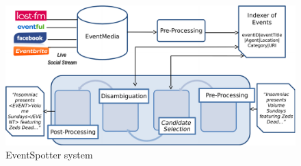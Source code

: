 \documentclass[10pt,a4paper]{article}
\begin{document}
%
%
%
%
%
%	
%
%	 

\begin{figure}
\includegraphics[width=\textwidth]{architecture}
\caption{EventSpotter system}
\label{fig:architecture}
\end{figure}
\end{document}
